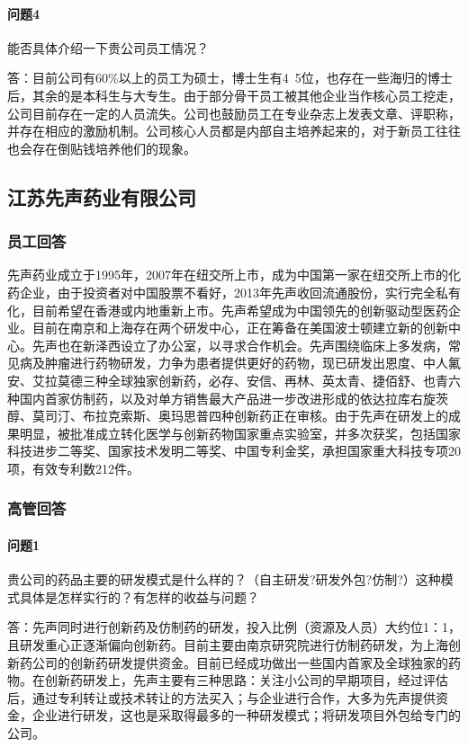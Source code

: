 \documentclass[twocolumn,openany]{ctexbook}
\begin{document}
	\paragraph{问题4}能否具体介绍一下贵公司员工情况？
	
	答：目前公司有60\%以上的员工为硕士，博士生有4~5位，也存在一些海归的博士后，其余的是本科生与大专生。由于部分骨干员工被其他企业当作核心员工挖走，公司目前存在一定的人员流失。公司也鼓励员工在专业杂志上发表文章、评职称，并存在相应的激励机制。公司核心人员都是内部自主培养起来的，对于新员工往往也会存在倒贴钱培养他们的现象。

	\subsection*{江苏先声药业有限公司}
	\subsubsection*{员工回答}先声药业成立于1995年，2007年在纽交所上市，成为中国第一家在纽交所上市的化药企业，由于投资者对中国股票不看好，2013年先声收回流通股份，实行完全私有化，目前希望在香港或内地重新上市。先声希望成为中国领先的创新驱动型医药企业。目前在南京和上海存在两个研发中心，正在筹备在美国波士顿建立新的创新中心。先声也在新泽西设立了办公室，以寻求合作机会。先声围绕临床上多发病，常见病及肿瘤进行药物研发，力争为患者提供更好的药物，现已研发出恩度、中人氟安、艾拉莫德三种全球独家创新药，必存、安信、再林、英太青、捷佰舒、也青六种国内首家仿制药，以及对单方销售最大产品进一步改进形成的依达拉库右旋茨醇、莫司汀、布拉克索斯、奥玛思普四种创新药正在审核。由于先声在研发上的成果明显，被批准成立转化医学与创新药物国家重点实验室，并多次获奖，包括国家科技进步二等奖、国家技术发明二等奖、中国专利金奖，承担国家重大科技专项20项，有效专利数212件。
	
	\subsubsection*{高管回答}
	
	\paragraph{问题1}贵公司的药品主要的研发模式是什么样的？（自主研发?研发外包?仿制?）这种模式具体是怎样实行的？有怎样的收益与问题？
	
	答：先声同时进行创新药及仿制药的研发，投入比例（资源及人员）大约位1：1，且研发重心正逐渐偏向创新药。目前主要由南京研究院进行仿制药研发，为上海创新药公司的创新药研发提供资金。目前已经成功做出一些国内首家及全球独家的药物。在创新药研发上，先声主要有三种思路：关注小公司的早期项目，经过评估后，通过专利转让或技术转让的方法买入；与企业进行合作，大多为先声提供资金，企业进行研发，这也是采取得最多的一种研发模式；将研发项目外包给专门的公司。
	
\end{document}
